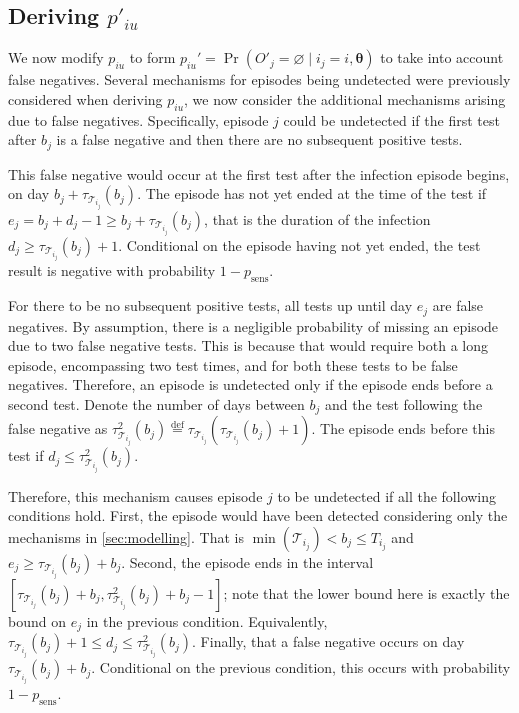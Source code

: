 \documentclass[referee,useAMS,usenatbib]{biom}
\DeclareMathOperator{\prob}{\mathrm{Pr}}
\renewcommand{\vec}[1]{\bm{#1}}
\newcommand{\psens}{p_\text{sens}}
\newcommand{\sched}{\mathcal{T}}
\begin{document}
\subsection{Deriving $p'_{iu}$} \label{imperf-test:sec:modifying-p_iu}

We now modify $p_{iu}$ to form $p_{iu}' = \prob(O'_j = \varnothing \mid i_j = i, \vec{\theta})$ to take into account false negatives.
Several mechanisms for episodes being undetected were previously considered when deriving $p_{iu}$, we now consider the additional mechanisms arising due to false negatives.
Specifically, episode $j$ could be undetected if the first test after $b_j$ is a false negative and then there are no subsequent positive tests.

This false negative would occur at the first test after the infection episode begins, on day $b_j + \tau_{\sched_{i_j}}(b_j)$.
The episode has not yet ended at the time of the test if $e_j = b_j + d_j - 1 \geq b_j + \tau_{\sched_{i_j}}(b_j)$, that is the duration of the infection $d_j \geq \tau_{\sched_{i_j}}(b_j) + 1$.
Conditional on the episode having not yet ended, the test result is negative with probability $1 - \psens$.

For there to be no subsequent positive tests, all tests up until day $e_j$ are false negatives.
By assumption, there is a negligible probability of missing an episode due to two false negative tests.
This is because that would require both a long episode, encompassing two test times, and for both these tests to be false negatives.
Therefore, an episode is undetected only if the episode ends before a second test.
Denote the number of days between $b_j$ and the test following the false negative as $\tau^2_{\sched_{i_j}}(b_j) \stackrel{\text{def}}{=} \tau_{\sched_{i_j}}(\tau_{\sched_{i_j}}(b_j) + 1)$.
The episode ends before this test if $d_j \leq \tau^2_{\sched_{i_j}}(b_j)$.

Therefore, this mechanism causes episode $j$ to be undetected if all the following conditions hold.
First, the episode would have been detected considering only the mechanisms in \cref{sec:modelling}.
That is $\min(\sched_{i_j}) < b_j \leq T_{i_j}$ and $e_j \geq \tau_{\sched_{i_j}}(b_j) + b_j$.
Second, the episode ends in the interval $[\tau_{\sched_{i_j}}(b_j) + b_j, \tau^2_{\sched_{i_j}}(b_j) + b_j - 1]$; note that the lower bound here is exactly the bound on $e_j$ in the previous condition.
Equivalently, $\tau_{\sched_{i_j}}(b_j) + 1 \leq d_j \leq \tau^2_{\sched_{i_j}}(b_j)$.
Finally, that a false negative occurs on day $\tau_{\sched_{i_j}}(b_j) + b_j$. Conditional on the previous condition, this occurs with probability $1 - \psens$.
\end{document}
